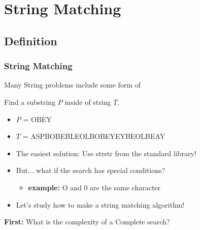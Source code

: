 \documentclass{beamer}
\begin{document}
\section{String Matching} %
\subsection{Definition}

\begin{frame}
  \frametitle{String Matching}

  {\smaller
  \begin{block}{}
    Many String problems include some form of 

    \medskip

    Find a substring $P$ inside of string $T$.
  \end{block}
  \begin{itemize}
  \item $P$ = OBEY
  \item $T$ = ASPBOBEBLEOLB\alert{OBEY}EYBEOLBEAY
  \end{itemize}

  \bigskip

  \begin{block}{}
    \begin{itemize}
    \item The easiest solution: Use strstr from the standard library!
    \item But... what if the search has special conditions?
    \begin{itemize}
      \item {\bf example:} O and 0 are the same character
    \end{itemize}
    \item Let's study how to make a string matching algorithm!
    \end{itemize}
  \end{block}

  {\bf First:} What is the complexity of a Complete search?

  }
\end{frame}
\end{document}
